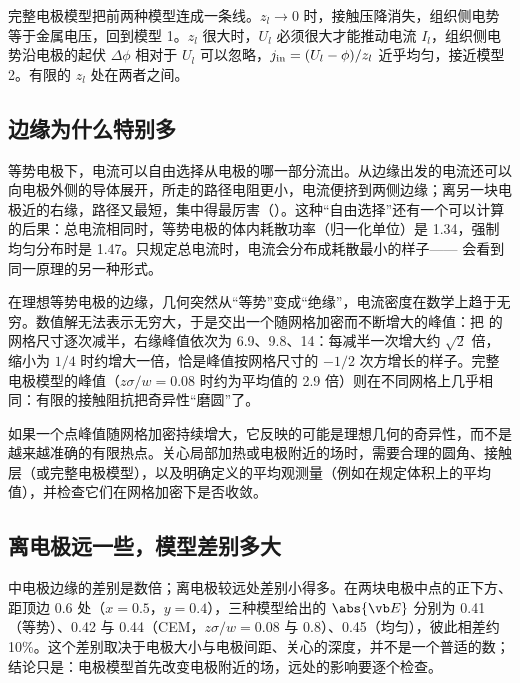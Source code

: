 完整电极模型把前两种模型连成一条线。$z_l\to0$ 时，接触压降消失，组织侧电势等于金属电压，回到模型 1。$z_l$ 很大时，$U_l$ 必须很大才能推动电流 $I_l$，组织侧电势沿电极的起伏 $\Delta\phi$ 相对于 $U_l$ 可以忽略，$j_{\rm in}=(U_l-\phi)/z_l$ 近乎均匀，接近模型 2。有限的 $z_l$ 处在两者之间。


\subsection{边缘为什么特别多}
等势电极下，电流可以自由选择从电极的哪一部分流出。从边缘出发的电流还可以向电极外侧的导体展开，所走的路径电阻更小，电流便挤到两侧边缘；离另一块电极近的右缘，路径又最短，集中得最厉害（）。这种“自由选择”还有一个可以计算的后果：总电流相同时，等势电极的体内耗散功率（归一化单位）是 1.34，强制均匀分布时是 1.47。只规定总电流时，电流会分布成耗散最小的样子—— 会看到同一原理的另一种形式。

在理想等势电极的边缘，几何突然从“等势”变成“绝缘”，电流密度在数学上趋于无穷。数值解无法表示无穷大，于是交出一个随网格加密而不断增大的峰值：把 的网格尺寸逐次减半，右缘峰值依次为 6.9、9.8、14：每减半一次增大约 $\sqrt2$ 倍，缩小为 $1/4$ 时约增大一倍，恰是峰值按网格尺寸的 $-1/2$ 次方增长的样子。完整电极模型的峰值（$z\sigma/w=0.08$ 时约为平均值的 2.9 倍）则在不同网格上几乎相同：有限的接触阻抗把奇异性“磨圆”了。

\begin{pitfall}
如果一个点峰值随网格加密持续增大，它反映的可能是理想几何的奇异性，而不是越来越准确的有限热点。关心局部加热或电极附近的场时，需要合理的圆角、接触层（或完整电极模型），以及明确定义的平均观测量（例如在规定体积上的平均值），并检查它们在网格加密下是否收敛。
\end{pitfall}

\subsection{离电极远一些，模型差别多大}
 中电极边缘的差别是数倍；离电极较远处差别小得多。在两块电极中点的正下方、距顶边 $0.6$ 处（$x=0.5$，$y=0.4$），三种模型给出的 $\abs{\vb E}$ 分别为 0.41（等势）、0.42 与 0.44（CEM，$z\sigma/w=0.08$ 与 0.8）、0.45（均匀），彼此相差约 10\%。这个差别取决于电极大小与电极间距、关心的深度，并不是一个普适的数；结论只是：电极模型首先改变电极附近的场，远处的影响要逐个检查。

